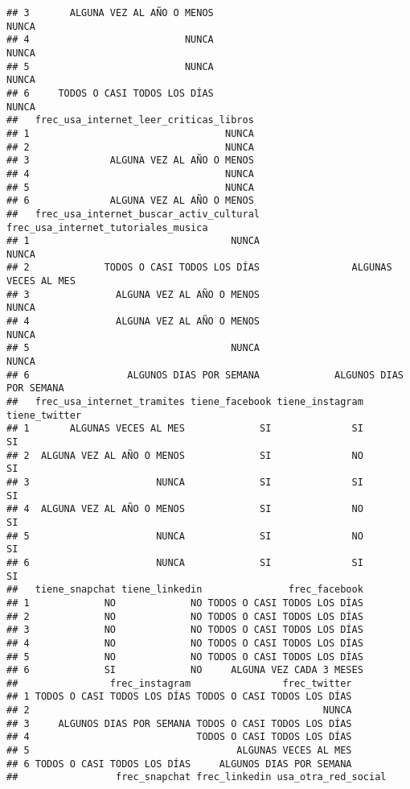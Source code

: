 \documentclass[
]{article}
\begin{document}
\begin{verbatim}
## 3       ALGUNA VEZ AL AÑO O MENOS                                     NUNCA
## 4                           NUNCA                                     NUNCA
## 5                           NUNCA                                     NUNCA
## 6     TODOS O CASI TODOS LOS DÍAS                                     NUNCA
##   frec_usa_internet_leer_criticas_libros
## 1                                  NUNCA
## 2                                  NUNCA
## 3              ALGUNA VEZ AL AÑO O MENOS
## 4                                  NUNCA
## 5                                  NUNCA
## 6              ALGUNA VEZ AL AÑO O MENOS
##   frec_usa_internet_buscar_activ_cultural frec_usa_internet_tutoriales_musica
## 1                                   NUNCA                               NUNCA
## 2             TODOS O CASI TODOS LOS DÍAS                ALGUNAS VECES AL MES
## 3               ALGUNA VEZ AL AÑO O MENOS                               NUNCA
## 4               ALGUNA VEZ AL AÑO O MENOS                               NUNCA
## 5                                   NUNCA                               NUNCA
## 6                 ALGUNOS DIAS POR SEMANA             ALGUNOS DIAS POR SEMANA
##   frec_usa_internet_tramites tiene_facebook tiene_instagram tiene_twitter
## 1       ALGUNAS VECES AL MES             SI              SI            SI
## 2  ALGUNA VEZ AL AÑO O MENOS             SI              NO            SI
## 3                      NUNCA             SI              SI            SI
## 4  ALGUNA VEZ AL AÑO O MENOS             SI              NO            SI
## 5                      NUNCA             SI              NO            SI
## 6                      NUNCA             SI              SI            SI
##   tiene_snapchat tiene_linkedin               frec_facebook
## 1             NO             NO TODOS O CASI TODOS LOS DÍAS
## 2             NO             NO TODOS O CASI TODOS LOS DÍAS
## 3             NO             NO TODOS O CASI TODOS LOS DÍAS
## 4             NO             NO TODOS O CASI TODOS LOS DÍAS
## 5             NO             NO TODOS O CASI TODOS LOS DÍAS
## 6             SI             NO     ALGUNA VEZ CADA 3 MESES
##                frec_instagram                frec_twitter
## 1 TODOS O CASI TODOS LOS DÍAS TODOS O CASI TODOS LOS DÍAS
## 2                                                   NUNCA
## 3     ALGUNOS DIAS POR SEMANA TODOS O CASI TODOS LOS DÍAS
## 4                             TODOS O CASI TODOS LOS DÍAS
## 5                                    ALGUNAS VECES AL MES
## 6 TODOS O CASI TODOS LOS DÍAS     ALGUNOS DIAS POR SEMANA
##                 frec_snapchat frec_linkedin usa_otra_red_social

\end{verbatim}
\end{document}
